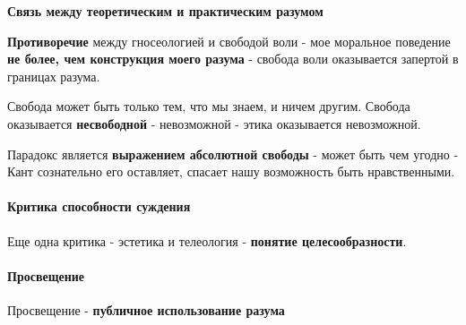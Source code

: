 \documentclass{article}
\begin{document}
\begin{flushleft}
\hfill

\textbf{Связь между теоретическим и практическим разумом}

\textbf{Противоречие} между гносеологией и свободой воли - мое моральное поведение \textbf{не более, чем конструкция моего разума} - свобода воли оказывается запертой в границах разума.

Свобода может быть только тем, что мы знаем, и ничем другим. Свобода оказывается \textbf{несвободной} - невозможной - этика оказывается невозможной.

Парадокс является \textbf{выражением абсолютной свободы} - может быть чем угодно - Кант сознательно его оставляет, спасает нашу возможность быть нравственными.

\paragraph{Критика способности суждения} Еще одна критика - эстетика и телеология - \textbf{понятие целесообразности}.

\paragraph{Просвещение} Просвещение - \textbf{публичное использование разума}

\end{flushleft}
\end{document}
